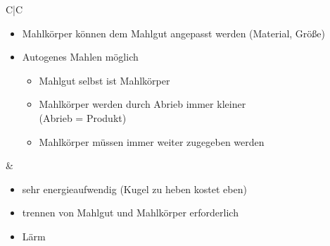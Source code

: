 \begin{itemize}
\begin{table}[h!]
{\begin{tabulary}{\textwidth}{C|C}
\begin{minipage}[t]{0.45\textwidth}
\begin{itemize}
					\item Mahlkörper können dem Mahlgut angepasst werden (Material, Größe)
					\item Autogenes Mahlen möglich
					\begin{itemize}
						\item Mahlgut selbst ist Mahlkörper
						\item Mahlkörper werden durch Abrieb immer kleiner \\
						(Abrieb = Produkt)
						\item Mahlkörper müssen immer weiter zugegeben werden
					\end{itemize}
				\end{itemize}
			\end{minipage} & 
			\begin{minipage}[t]{0.35\textwidth}
				\begin{itemize}
					\item sehr energieaufwendig (Kugel zu heben kostet eben)
					\item trennen von Mahlgut und Mahlkörper erforderlich
					\item Lärm
				\end{itemize}
			\end{minipage}\\
		\end{tabulary}}
	\end{table}
	\FloatBarrier
	\vspace*{-2.5mm}
\end{itemize}

\newpage







